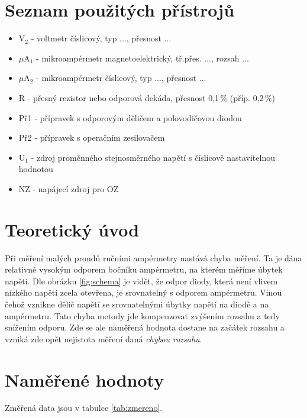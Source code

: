 \documentclass[a4paper,12pt]{article}   %
\newcommand{\tsub}[1]{$_\textrm{#1}$}
\begin{document}
\section{Seznam použitých přístrojů}
\begin{itemize}
    \item V\tsub{2} - voltmetr číslicový, typ ..., přesnost ...
    \item $\mu$A\tsub{1} - mikroampérmetr magnetoelektrický, tř.přes. ..., rozsah ...
    \item $\mu$A\tsub{2} - mikroampérmetr číslicový, typ ..., přesnost ...
    \item R - přesný rezistor nebo odporová dekáda, přesnost 0,1\,\% (příp. 0,2\,\%)
    \item Př1 - přípravek s odporovým děličem a polovodičovou diodou
    \item Př2 - přípravek s operačním zesilovačem
    \item U\tsub{1} - zdroj proměnného stejnosměrného napětí s číslicově nastavitelnou hodnotou 
    \item NZ - napájecí zdroj pro OZ
\end{itemize}

\section{Teoretický úvod}
Při měření malých proudů ručními ampérmetry nastává chyba měření. Ta je dána relativně vysokým odporem bočníku ampérmetru, na kterém měříme úbytek napětí. Dle obrázku \ref{fig:schema} je vidět, že odpor diody, která není vlivem nízkého napětí zcela otevřena, je srovnatelný s odporem ampérmetru. Vinou čehož vznikne dělič napětí se srovnatelnými úbytky napětí na diodě a na ampérmetru. Tato chyba metody jde kompenzovat zvýšením rozsahu a tedy snížením odporu. Zde se ale naměřená hodnota dostane na začátek rozsahu a vzniká zde opět nejistota měření daná \textit{chybou rozsahu}. 


\section{Naměřené hodnoty}
Změřená data jsou v tabulce \ref{tab:zmereno}.
\end{document}
